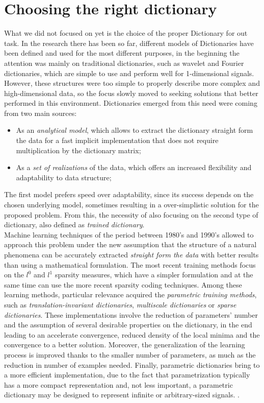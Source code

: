 \section{Choosing the right dictionary}
 What we did not focused on yet is the choice of the proper Dictionary for out task. In the research there has been so far, different models of Dictionaries have been defined and used for the most different purposes, in the beginning the attention was mainly on traditional dictionaries, such as wavelet and Fourier dictionaries, which are simple to use and perform well for 1-dimensional signals. However, these structures were too simple to properly describe more complex and high-dimensional data, so the focus slowly moved to seeking solutions that better performed in this environment. Dictionaries emerged from this need were coming from two main sources:
 \begin{itemize}
 \item As an \textit{analytical model}, which allows to extract the dictionary straight form the data for a fast implicit implementation that does not require multiplication by the dictionary matrix;
 \item As a \textit{set of realizations} of the data, which offers an increased flexibility and adaptability to data structure;
\end{itemize}
The first model prefers speed over adaptability, since its success depends on the chosen underlying model, sometimes resulting in a over-simplistic solution for the proposed problem. From this, the necessity of also focusing on the second type of dictionary, also defined as \textit{trained dictionary}.\\
Machine learning techniques of the period between 1980's and 1990's allowed to approach this problem under the new assumption that the structure of a natural phenomena can be accurately extracted \textit{straight form the data} with better results than using a mathematical formulation. The most recent training methods focus on the $l^0$ and $l^1$ sparsity measures, which have a simpler formulation and at the same time can use the more recent sparsity coding techniques. \cite{Gorodnitsky1997} \cite{Pati1993}
Among these learning methods, particular relevance acquired the \textit{parametric training methods}, such as \textit{translation-invariant dictionaries}, \textit{multiscale dictionaries} or \textit{sparse dictionaries}. These implementations involve the reduction of parameters' number and the assumption of several desirable properties on the dictionary, in the end leading to an accelerate convergence, reduced density of the local minima and the convergence to a better solution. Moreover, the generalization of the learning process is improved thanks to the smaller number of parameters, as much as the reduction in number of examples needed. Finally, parametric dictionaries bring to a more efficient implementation, due to the fact that parametrization typically has a more compact representation and, not less important, a parametric dictionary may be designed to represent infinite or arbitrary-sized signals. \cite{Rubinstein2010} .
